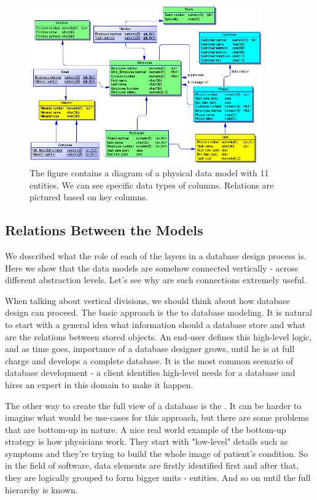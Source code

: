 \begin{figure}[H]
	\centering
	\includegraphics[width=10cm]{../img/Physical_Model_PowerDesigner}
	\caption[Physical diagram\cite{PowerDesignerDocumentation}]{The figure contains a diagram of a physical data model with 11 entities. We can see specific data types of columns. Relations are pictured based on key columns.}
\end{figure}

\subsection{Relations Between the Models}

We described what the role of each of the layers in a database design process is.
Here we show that the data models are somehow connected vertically - across different abstraction levels. Let's see why are such connections extremely useful.

When talking about vertical divisions, we should think about how database design can proceed.
The basic approach is the  to database modeling.
It is natural to start with a general idea what information should a database store and what are the relations between stored objects. 
An end-user defines this high-level logic, and as time goes, importance of a database designer grows, until he is at full charge and develops a complete database. It is the most common scenario of database development - a client identifies high-level needs for a database and hires an expert in this domain to make it happen.

The other way to create the full view of a database is the . It can be harder to imagine what would be use-cases for this approach, but there are some problems that are bottom-up in nature. A nice real world example of the bottom-up strategy is how physicians work. 
They start with "low-level" details such as symptoms and they're trying to build the whole image of patient's condition. So in the field of software, data elements are firstly identified first and after that, they are logically grouped to form bigger units - entities. And so on until the full hierarchy is known.

